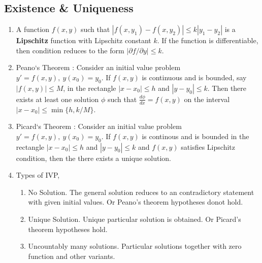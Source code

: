 \subsection{Existence \& Uniqueness}
\begin{enumerate}
	\item A function $f(x,y)$ such that $|f(x,y_1)-f(x,y_2)| \le k|y_1-y_2|$ is a \textbf{Lipschitz} function with Lipschitz constant $k$. If the function is differentiable, then condition reduces to the form $|\partial f/\partial y| \le k$.
	\item Peano`s Theorem : Consider an initial value problem $y' = f(x,y),\ y(x_0) = y_0$. If $f(x,y)$ is continuous and is bounded, say $|f(x,y)| \le M$, in the rectangle $|x-x_0| \le h$ and $|y-y_0|\le k$. Then there exists at least one solution $\phi$ such that $\frac{d\phi}{dx} = f(x,y)$ on the interval $|x-x_0| \le \min\{ h,k/M \}$. %
	\item Picard`s Theorem : Consider an initial value problem $y' = f(x,y),\ y(x_0) = y_0$. If $f(x,y)$ is continous and is bounded in the rectangle $|x-x_0| \le h$ and $|y-y_0| \le k$ and $f(x,y)$ satisfies Lipschitz condition, then the there exists a unique solution.
	\item Types of IVP,
	\begin{enumerate} 
		\item No Solution. The general solution reduces to an contradictory statement with given initial values. Or Peano's theorem hypotheses donot hold.
		\item Unique Solution. Unique particular solution is obtained. Or Picard's theorem hypotheses hold.
		\item Uncountably many solutions. Particular solutions together with zero function and other variants.
	\end{enumerate}
\end{enumerate}

